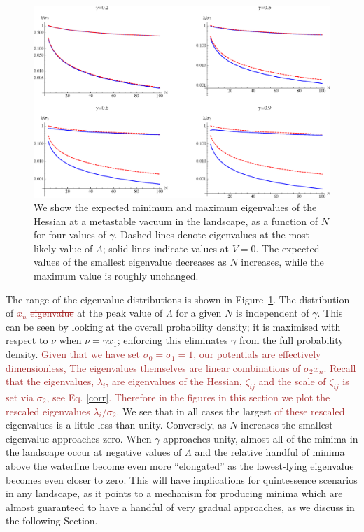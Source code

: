 \documentclass[12pt]{article}
\newcommand{\sh}[1]{\textcolor{brown}{#1}}
\begin{document}
\begin{figure} 
  \centering
  \includegraphics[width=.9\linewidth]{eign.eps}
  \caption{We show the expected minimum and maximum eigenvalues of the Hessian at a metastable vacuum in the landscape, as a function of $N$ for four values of $\gamma$.  Dashed lines denote eigenvalues at the most likely value of $\Lambda$; solid lines indicate values at $V=0$. The expected values of the smallest eigenvalue decreases as $N$ increases, while the maximum value is roughly unchanged. }
  \label{eigen}
\end{figure}

The range of the eigenvalue distributions is shown in Figure~\ref{eigen}. The distribution of \sh{$x_n$ \sout{eigenvalue}} at the peak value of $\Lambda$ for a given $N$ is independent of $\gamma$. This can be seen by looking at the overall probability density; it is maximised with respect to $\nu$ when $\nu = \gamma x_1$; enforcing this eliminates $\gamma$ from the full  probability density. \sh{\sout{Given that we have set $\sigma_0 = \sigma_1=1$, our potentials are effectively dimensionless,} The eigenvalues themselves are linear combinations of $\sigma_2x_n$. Recall that the eigenvalues, $\lambda_i$, are eigenvalues of the Hessian, $\zeta_{ij}$ and the scale of $\zeta_{ij}$ is set via $\sigma_2$, see Eq. \eqref{corr}. Therefore in the figures in this section we plot the rescaled eigenvalues $\lambda_i/\sigma_2$.} We see that in all cases the largest \sh{of these rescaled} eigenvalues is a little less than unity. Conversely, as $N$ increases the smallest eigenvalue approaches zero. When $\gamma$ approaches unity, almost all of the minima in the landscape  occur at negative values of $\Lambda$ and the relative handful of minima above the waterline become even more ``elongated'' as the lowest-lying eigenvalue becomes even closer to zero. This will have implications for quintessence scenarios in any landscape, as it points to a mechanism for producing minima which are almost guaranteed to have a handful of very gradual approaches, as we discuss in the following Section. 
\end{document}
